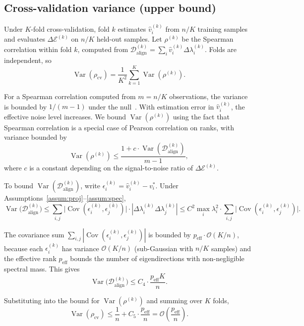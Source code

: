 \documentclass[twoside,11pt]{article}
\begin{document}
\subsection{Cross-validation variance (upper bound)}

Under $K$-fold cross-validation, fold $k$ estimates $\hat{v}_i^{(k)}$ from $n/K$ training samples and evaluates $\Delta\mathcal{E}^{(k)}$ on $n/K$ held-out samples.  Let $\rho^{(k)}$ be the Spearman correlation within fold $k$, computed from $\mathcal{D}_{\text{align}}^{(k)} = \sum_i \hat{v}_i^{(k)} \Delta\lambda_i^{(k)}$.  Folds are independent, so
\[
\operatorname{Var}(\rho_{\text{cv}}) = \frac{1}{K^2} \sum_{k=1}^K \operatorname{Var}(\rho^{(k)}).
\]

For a Spearman correlation computed from $m = n/K$ observations, the variance is bounded by $1/(m-1)$ under the null~\citep{kendall1979rank}.  With estimation error in $\hat{v}_i^{(k)}$, the effective noise level increases.  We bound $\operatorname{Var}(\rho^{(k)})$ using the fact that Spearman correlation is a special case of Pearson correlation on ranks, with variance bounded by
\[
\operatorname{Var}(\rho^{(k)}) \leq \frac{1 + c \cdot \operatorname{Var}(\mathcal{D}_{\text{align}}^{(k)})}{m - 1},
\]
where $c$ is a constant depending on the signal-to-noise ratio of $\Delta\mathcal{E}^{(k)}$.

To bound $\operatorname{Var}(\mathcal{D}_{\text{align}}^{(k)})$, write $\epsilon_i^{(k)} = \hat{v}_i^{(k)} - v_i^*$.  Under Assumptions~\ref{assum:proj}--\ref{assum:spec},
\[
\operatorname{Var}\bigl(\mathcal{D}_{\text{align}}^{(k)}\bigr) \leq \sum_{i,j} \bigl|\operatorname{Cov}(\epsilon_i^{(k)}, \epsilon_j^{(k)})\bigr| \cdot |\Delta\lambda_i^{(k)}\Delta\lambda_j^{(k)}|
\leq C^2 \max_i \lambda_i^2 \cdot \sum_{i,j} \bigl|\operatorname{Cov}(\epsilon_i^{(k)}, \epsilon_j^{(k)})\bigr|.
\]

The covariance sum $\sum_{i,j} |\operatorname{Cov}(\epsilon_i^{(k)}, \epsilon_j^{(k)})|$ is bounded by $p_{\text{eff}} \cdot \mathcal{O}(K/n)$, because each $\epsilon_i^{(k)}$ has variance $\mathcal{O}(K/n)$ (sub-Gaussian with $n/K$ samples) and the effective rank $p_{\text{eff}}$ bounds the number of eigendirections with non-negligible spectral mass.  This gives
\[
\operatorname{Var}\bigl(\mathcal{D}_{\text{align}}^{(k)}\bigr) \leq C_4 \cdot \frac{p_{\text{eff}} K}{n}.
\]

Substituting into the bound for $\operatorname{Var}(\rho^{(k)})$ and summing over $K$ folds,
\[
\operatorname{Var}(\rho_{\text{cv}}) \leq \frac{1}{n} + C_5 \cdot \frac{p_{\text{eff}}}{n} = \mathcal{O}\!\left(\frac{p_{\text{eff}}}{n}\right).
\]
\end{document}
